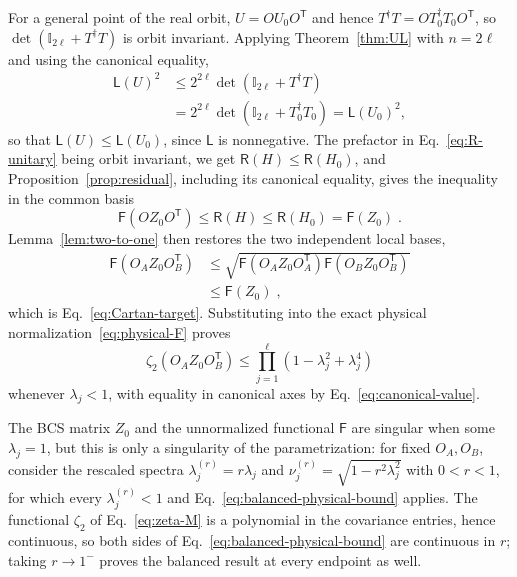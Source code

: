 \documentclass[prx,twocolumn,superscriptaddress,aps,10pt, frontmatterverbose, reprint,footinbib,longbibliography=true]{revtex4-2}
\newcommand{\trans}{\mathsf{T}}
\begin{document}
For a general point of the real orbit, $U=OU_0O^{\trans}$ and hence $T^\dagger T=OT_0^\dagger T_0O^{\trans}$, so $\det(\mathbb{I}_{2\ell}+T^\dagger T)$ is orbit invariant. Applying Theorem~\ref{thm:UL} with $n=2\ell$ and using the canonical equality,
\begin{equation}
\begin{split}
    \mathsf{L}(U)^2&\le 2^{2\ell}\det(\mathbb{I}_{2\ell}+T^\dagger T)\\&=2^{2\ell}\det(\mathbb{I}_{2\ell}+T_0^\dagger T_0)=\mathsf{L}(U_0)^2 ,
\end{split}
\end{equation}
so that $\mathsf{L}(U)\le \mathsf{L}(U_0)$, since $\mathsf{L}$ is nonnegative. The prefactor in Eq.~\eqref{eq:R-unitary} being orbit invariant, we get $\mathsf{R}(H)\le \mathsf{R}(H_0)$, and Proposition~\ref{prop:residual}, including its canonical equality, gives the inequality in the common basis
\begin{equation}
    \mathsf{F}(OZ_0O^{\trans})\le \mathsf{R}(H)\le \mathsf{R}(H_0)=\mathsf{F}(Z_0)\;.
\end{equation}
Lemma~\ref{lem:two-to-one} then restores the two independent local bases,
\begin{equation}
\begin{split}
    \mathsf{F}(O_AZ_0O_B^{\trans})&\le\sqrt{\mathsf{F}(O_AZ_0O_A^{\trans})\mathsf{F}(O_BZ_0O_B^{\trans})}\\&\le \mathsf{F}(Z_0)\;,
\end{split}
\end{equation}
which is Eq.~\eqref{eq:Cartan-target}. Substituting into the exact physical normalization~\eqref{eq:physical-F} proves
\begin{equation}
    \zeta_2\!\left(O_AZ_0O_B^{\trans}\right)\le\prod_{j=1}^{\ell}\left(1-\lambda_j^2+\lambda_j^4\right)
    \label{eq:balanced-physical-bound}
\end{equation}
whenever $\lambda_j<1$, with equality in canonical axes by Eq.~\eqref{eq:canonical-value}.

The BCS matrix $Z_0$ and the unnormalized functional $\mathsf{F}$ are singular when some $\lambda_j=1$, but this is only a singularity of the parametrization: for fixed $O_A,O_B$, consider the rescaled spectra $\lambda_j^{(r)}=r\lambda_j$ and $\nu_j^{(r)}=\sqrt{1-r^2\lambda_j^2}$ with $0<r<1$, for which every $\lambda_j^{(r)}<1$ and Eq.~\eqref{eq:balanced-physical-bound} applies. The functional $\zeta_2$ of Eq.~\eqref{eq:zeta-M} is a polynomial in the covariance entries, hence continuous, so both sides of Eq.~\eqref{eq:balanced-physical-bound} are continuous in $r$; taking $r\to1^-$ proves the balanced result at every endpoint as well.
\end{document}
